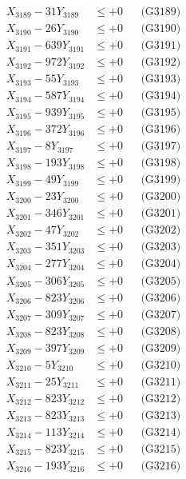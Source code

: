 \documentclass[a4paper,10pt]{article}
\begin{document}
{\begin{align}
X_{3189} - 31Y_{3189} &\leq +0 && \text{(G3189)} \\
X_{3190} - 26Y_{3190} &\leq +0 && \text{(G3190)} \\
\allowbreak
X_{3191} - 639Y_{3191} &\leq +0 && \text{(G3191)} \\
X_{3192} - 972Y_{3192} &\leq +0 && \text{(G3192)} \\
X_{3193} - 55Y_{3193} &\leq +0 && \text{(G3193)} \\
X_{3194} - 587Y_{3194} &\leq +0 && \text{(G3194)} \\
X_{3195} - 939Y_{3195} &\leq +0 && \text{(G3195)} \\
X_{3196} - 372Y_{3196} &\leq +0 && \text{(G3196)} \\
X_{3197} - 8Y_{3197} &\leq +0 && \text{(G3197)} \\
X_{3198} - 193Y_{3198} &\leq +0 && \text{(G3198)} \\
X_{3199} - 49Y_{3199} &\leq +0 && \text{(G3199)} \\
X_{3200} - 23Y_{3200} &\leq +0 && \text{(G3200)} \\
\allowbreak
X_{3201} - 346Y_{3201} &\leq +0 && \text{(G3201)} \\
X_{3202} - 47Y_{3202} &\leq +0 && \text{(G3202)} \\
X_{3203} - 351Y_{3203} &\leq +0 && \text{(G3203)} \\
X_{3204} - 277Y_{3204} &\leq +0 && \text{(G3204)} \\
X_{3205} - 306Y_{3205} &\leq +0 && \text{(G3205)} \\
X_{3206} - 823Y_{3206} &\leq +0 && \text{(G3206)} \\
X_{3207} - 309Y_{3207} &\leq +0 && \text{(G3207)} \\
X_{3208} - 823Y_{3208} &\leq +0 && \text{(G3208)} \\
X_{3209} - 397Y_{3209} &\leq +0 && \text{(G3209)} \\
X_{3210} - 5Y_{3210} &\leq +0 && \text{(G3210)} \\
\allowbreak
X_{3211} - 25Y_{3211} &\leq +0 && \text{(G3211)} \\
X_{3212} - 823Y_{3212} &\leq +0 && \text{(G3212)} \\
X_{3213} - 823Y_{3213} &\leq +0 && \text{(G3213)} \\
X_{3214} - 113Y_{3214} &\leq +0 && \text{(G3214)} \\
X_{3215} - 823Y_{3215} &\leq +0 && \text{(G3215)} \\
X_{3216} - 193Y_{3216} &\leq +0 && \text{(G3216)} \\

\end{align}}
\end{document}
